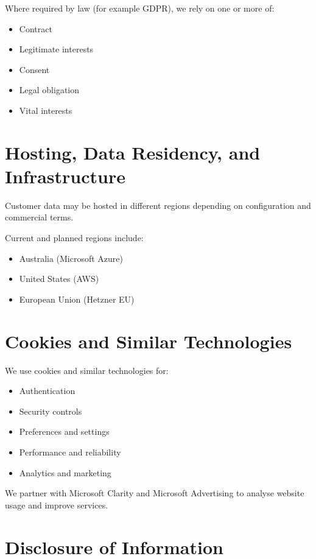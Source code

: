 \documentclass[11pt]{article}
\begin{document}
Where required by law (for example GDPR), we rely on one or more of:

\begin{itemize}
\item Contract
\item Legitimate interests
\item Consent
\item Legal obligation
\item Vital interests
\end{itemize}

\section{Hosting, Data Residency, and Infrastructure}

Customer data may be hosted in different regions depending on configuration and commercial terms.

Current and planned regions include:

\begin{itemize}
\item Australia (Microsoft Azure)
\item United States (AWS)
\item European Union (Hetzner EU)
\end{itemize}

\section{Cookies and Similar Technologies}

We use cookies and similar technologies for:

\begin{itemize}
\item Authentication
\item Security controls
\item Preferences and settings
\item Performance and reliability
\item Analytics and marketing
\end{itemize}

We partner with Microsoft Clarity and Microsoft Advertising to analyse website usage and improve services.

\section{Disclosure of Information}
\end{document}
